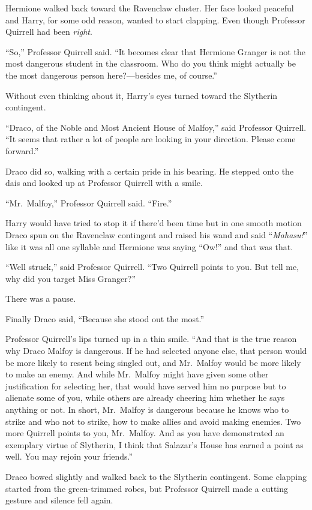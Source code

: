 Hermione walked back toward the Ravenclaw cluster. Her face looked peaceful and Harry, for some odd reason, wanted to start clapping. Even though Professor Quirrell had been \emph{right}.

“So,” Professor Quirrell said. “It becomes clear that Hermione Granger is not the most dangerous student in the classroom. Who do you think might actually be the most dangerous person here?—besides me, of course.”

Without even thinking about it, Harry’s eyes turned toward the Slytherin contingent.

“Draco, of the Noble and Most Ancient House of Malfoy,” said Professor Quirrell. “It seems that rather a lot of people are looking in your direction. Please come forward.”

Draco did so, walking with a certain pride in his bearing. He stepped onto the dais and looked up at Professor Quirrell with a smile.

“Mr.~Malfoy,” Professor Quirrell said. “Fire.”

Harry would have tried to stop it if there’d been time but in one smooth motion Draco spun on the Ravenclaw contingent and raised his wand and said “\emph{Mahasu!}” like it was all one syllable and Hermione was saying “Ow!” and that was that.

“Well struck,” said Professor Quirrell. “Two Quirrell points to you. But tell me, why did you target Miss Granger?”

There was a pause.

Finally Draco said, “Because she stood out the most.”

Professor Quirrell’s lips turned up in a thin smile. “And that is the true reason why Draco Malfoy is dangerous. If he had selected anyone else, that person would be more likely to resent being singled out, and Mr.~Malfoy would be more likely to make an enemy. And while Mr.~Malfoy might have given some other justification for selecting her, that would have served him no purpose but to alienate some of you, while others are already cheering him whether he says anything or not. In short, Mr.~Malfoy is dangerous because he knows who to strike and who not to strike, how to make allies and avoid making enemies. Two more Quirrell points to you, Mr.~Malfoy. And as you have demonstrated an exemplary virtue of Slytherin, I think that Salazar’s House has earned a point as well. You may rejoin your friends.”

Draco bowed slightly and walked back to the Slytherin contingent. Some clapping started from the green-trimmed robes, but Professor Quirrell made a cutting gesture and silence fell again.

